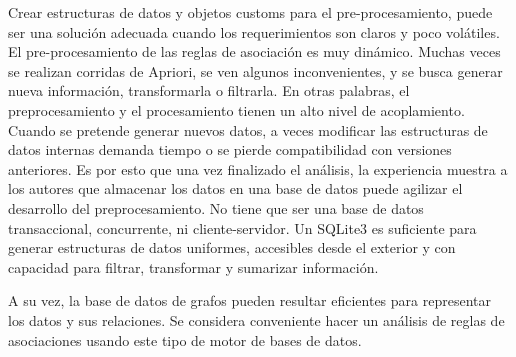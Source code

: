 \documentclass[journal]{IEEEtran}
\begin{document}
Crear estructuras de datos y objetos customs para el pre-procesamiento, puede
ser una solución adecuada cuando los requerimientos son claros y poco
volátiles. El pre-procesamiento de las reglas de asociación es muy dinámico. 
Muchas veces se realizan corridas de Apriori, se ven algunos inconvenientes,
y se busca generar nueva información, transformarla o filtrarla. En otras
palabras, el preprocesamiento y el procesamiento tienen un alto
nivel de acoplamiento. Cuando se
pretende generar nuevos datos, a veces modificar las estructuras de datos 
internas demanda tiempo o se pierde compatibilidad con versiones anteriores. Es
por esto que una vez finalizado el análisis, la experiencia muestra a los
autores que almacenar los datos en una base de datos puede agilizar
el desarrollo del preprocesamiento. No tiene que ser una base de datos
transaccional, concurrente, ni cliente-servidor. Un SQLite3 es suficiente
para generar estructuras de datos uniformes, accesibles desde el exterior
y con capacidad para filtrar, transformar y sumarizar información.

A su vez, la base de datos de grafos pueden resultar eficientes para representar
los datos y sus relaciones. Se considera conveniente hacer un análisis de 
reglas de asociaciones usando este tipo de motor de bases de datos.
\end{document}
